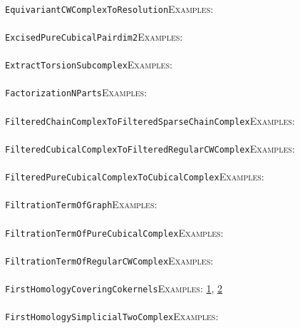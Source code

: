 \documentclass[a4paper,11pt]{report}
\begin{document}
{{ \\
 \texttt{EquivariantCWComplexToResolution}{\nobreakspace}{\nobreakspace}{\nobreakspace}{\nobreakspace}\textsc{Examples:} \\
 \\
 \texttt{ExcisedPureCubicalPair{\textunderscore}dim{\textunderscore}2}{\nobreakspace}{\nobreakspace}{\nobreakspace}{\nobreakspace}\textsc{Examples:} \\
 \\
 \texttt{ExtractTorsionSubcomplex}{\nobreakspace}{\nobreakspace}{\nobreakspace}{\nobreakspace}\textsc{Examples:} \\
 \\
 \texttt{FactorizationNParts}{\nobreakspace}{\nobreakspace}{\nobreakspace}{\nobreakspace}\textsc{Examples:} \\
 \\
 \texttt{FilteredChainComplexToFilteredSparseChainComplex}{\nobreakspace}{\nobreakspace}{\nobreakspace}{\nobreakspace}\textsc{Examples:} \\
 \\
 \texttt{FilteredCubicalComplexToFilteredRegularCWComplex}{\nobreakspace}{\nobreakspace}{\nobreakspace}{\nobreakspace}\textsc{Examples:} \\
 \\
 \texttt{FilteredPureCubicalComplexToCubicalComplex}{\nobreakspace}{\nobreakspace}{\nobreakspace}{\nobreakspace}\textsc{Examples:} \\
 \\
 \texttt{FiltrationTermOfGraph}{\nobreakspace}{\nobreakspace}{\nobreakspace}{\nobreakspace}\textsc{Examples:} \\
 \\
 \texttt{FiltrationTermOfPureCubicalComplex}{\nobreakspace}{\nobreakspace}{\nobreakspace}{\nobreakspace}\textsc{Examples:} \\
 \\
 \texttt{FiltrationTermOfRegularCWComplex}{\nobreakspace}{\nobreakspace}{\nobreakspace}{\nobreakspace}\textsc{Examples:} \\
 \\
 \texttt{FirstHomologyCoveringCokernels}{\nobreakspace}{\nobreakspace}{\nobreakspace}{\nobreakspace}\textsc{Examples:} \href{tutorial/chap3.html} {1}{\nobreakspace}, \href{../www/SideLinks/About/aboutCoverinSpaces.html} {2}{\nobreakspace} \\
 \\
 \texttt{FirstHomologySimplicialTwoComplex}{\nobreakspace}{\nobreakspace}{\nobreakspace}{\nobreakspace}\textsc{Examples:} \\
}}
\end{document}
